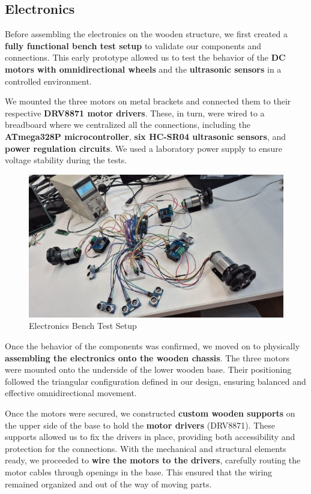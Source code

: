 \subsection{Electronics}

Before assembling the electronics on the wooden structure, we first created a \textbf{fully functional bench test setup} to validate our components and connections. This early prototype allowed us to test the behavior of the \textbf{DC motors with omnidirectional wheels} and the \textbf{ultrasonic sensors} in a controlled environment.

We mounted the three motors on metal brackets and connected them to their respective \textbf{DRV8871 motor drivers}. These, in turn, were wired to a breadboard where we centralized all the connections, including the \textbf{ATmega328P microcontroller}, \textbf{six HC-SR04 ultrasonic sensors}, and \textbf{power regulation circuits}. We used a laboratory power supply to ensure voltage stability during the tests.

\begin{figure}[H]
    \centering
    \includegraphics[width=0.6\linewidth]{../ReportMovementModule/images/Aspose.Words.728084da-df58-4b9d-a372-f65cffbdb23d.010.jpeg}
    \caption{Electronics Bench Test Setup}
\end{figure}

Once the behavior of the components was confirmed, we moved on to physically \textbf{assembling the electronics onto the wooden chassis}. The three motors were mounted onto the underside of the lower wooden base. Their positioning followed the triangular configuration defined in our design, ensuring balanced and effective omnidirectional movement.

Once the motors were secured, we constructed \textbf{custom wooden supports} on the upper side of the base to hold the \textbf{motor drivers} (DRV8871). These supports allowed us to fix the drivers in place, providing both accessibility and protection for the connections. With the mechanical and structural elements ready, we proceeded to \textbf{wire the motors to the drivers}, carefully routing the motor cables through openings in the base. This ensured that the wiring remained organized and out of the way of moving parts.

